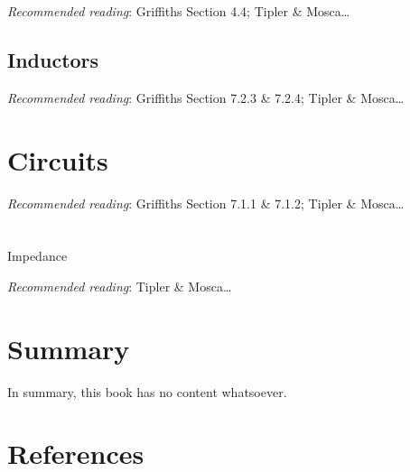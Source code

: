\documentclass[
  letterpaper,
  DIV=11,
  numbers=noendperiod]{scrreprt}
\newlength{\cslhangindent}
\newenvironment{CSLReferences}[2] %
 {\begin{list}{}{%
  \setlength{\itemindent}{0pt}
  \setlength{\leftmargin}{0pt}
  \setlength{\parsep}{0pt}
  \ifodd #1
   \setlength{\leftmargin}{\cslhangindent}
   \setlength{\itemindent}{-1\cslhangindent}
  \fi
  \setlength{\itemsep}{#2\baselineskip}}}
 {\end{list}}
\begin{document}
\emph{Recommended reading}: Griffiths Section 4.4; Tipler \&
Mosca\ldots{}

\section{Inductors}\label{inductors}

\emph{Recommended reading}: Griffiths Section 7.2.3 \& 7.2.4; Tipler \&
Mosca\ldots{}


\chapter{Circuits}\label{circuits}

\newcommand{\l}{\mathrm{\mathbf{l}}}
\newcommand{\E}{\mathrm{\mathbf{E}}}
\newcommand{\F}{\mathrm{\mathbf{F}}}
\newcommand{\r}{\mathrm{\mathbf{r}}}

\newcommand{\x}{\mathrm{\mathbf{x}}}
\newcommand{\y}{\mathrm{\mathbf{y}}}
\newcommand{\z}{\mathrm{\mathbf{z}}}

\emph{Recommended reading}: Griffiths Section 7.1.1 \& 7.1.2; Tipler \&
Mosca\ldots{}


\chapter{}\label{section}

\newcommand{\l}{\mathrm{\mathbf{l}}}
\newcommand{\E}{\mathrm{\mathbf{E}}}
\newcommand{\F}{\mathrm{\mathbf{F}}}
\newcommand{\r}{\mathrm{\mathbf{r}}}

\newcommand{\x}{\mathrm{\mathbf{x}}}
\newcommand{\y}{\mathrm{\mathbf{y}}}
\newcommand{\z}{\mathrm{\mathbf{z}}}

Impedance

\emph{Recommended reading}: Tipler \& Mosca\ldots{}


\chapter{Summary}\label{summary-2}

In summary, this book has no content whatsoever.


\chapter*{References}\label{references}


\label{refs}
\begin{CSLReferences}{0}{1}
\end{CSLReferences}
\end{document}
